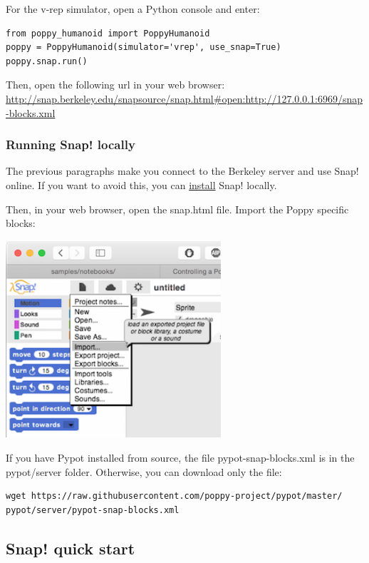 \documentclass{article}
\begin{document}
For the v-rep simulator, open a Python console and enter:

\begin{verbatim}
from poppy_humanoid import PoppyHumanoid
poppy = PoppyHumanoid(simulator='vrep', use_snap=True)
poppy.snap.run()
\end{verbatim}

Then, open the following url in your web browser: \url{http://snap.berkeley.edu/snapsource/snap.html#open:http://127.0.0.1:6969/snap-blocks.xml}

\subsubsection{Running Snap! locally}

The previous paragraphs make you connect to the Berkeley server and use Snap! online. If you want to avoid this, you can \href{https://github.com/jmoenig/Snap--Build-Your-Own-Blocks}{install} Snap! locally.

Then, in your web browser, open the snap.html file. Import the Poppy specific blocks:

 \begin{center}
  \includegraphics[width=0.6\textwidth]{img/snap-import}
 \end{center}

If you have Pypot installed from source, the file pypot-snap-blocks.xml is in the pypot/server folder. Otherwise, you can download only the file:
\begin{verbatim}
wget https://raw.githubusercontent.com/poppy-project/pypot/master/
pypot/server/pypot-snap-blocks.xml
\end{verbatim}

\subsection{Snap! quick start}
\end{document}
